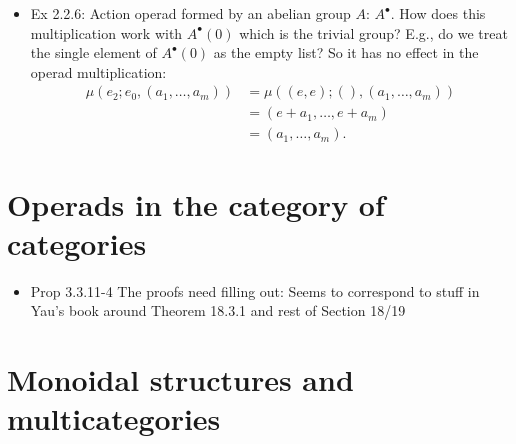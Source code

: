 \documentclass{amsart}
\begin{document}
\begin{itemize}
\item Ex 2.2.6: Action operad formed by an abelian group $A$: $A^\bullet$. How does this multiplication work with $A^\bullet(0)$ which is the trivial group? E.g., do we treat the single element of $A^\bullet(0)$ as the empty list? So it has no effect in the operad multiplication:
	\begin{align*}
		\mu(e_2;e_0,(a_1,\ldots,a_m)) &= \mu((e,e);(),(a_1,\ldots,a_m))\\
		&= (e+a_1,\ldots,e+a_m)\\
		&= (a_1,\ldots,a_m).
	\end{align*}
\end{itemize}

\section{Operads in the category of categories}
\begin{itemize}
\item Prop 3.3.11-4 The proofs need filling out: Seems to correspond to stuff in Yau's book around Theorem 18.3.1 and rest of Section 18/19
\end{itemize}

\section{Monoidal structures and multicategories}
\end{document}
